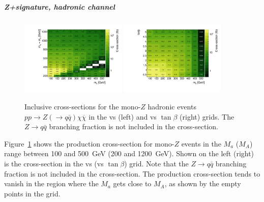 \subparagraph{Z+\MET signature, hadronic channel}

\begin{figure}
\centering
\includegraphics[width=0.45\textwidth]{texinputs/04_grid/figures/monoz/hadronic/grid_mA_ma_xsec.pdf}
\includegraphics[width=0.45\textwidth]{texinputs/04_grid/figures/monoz/hadronic/grid_tanb_ma_xsec.pdf}
\caption{Inclusive cross-sections for the mono-$Z$ hadronic events 
$pp \rightarrow Z(\to q\bar{q})\chi\overline{\chi}$ in the \ma vs \mA (left) and \ma vs $\tan\beta$ (right) grids.
The $Z \to q\bar{q}$ branching fraction is not included in the cross-section.}
\label{fig:monozhad_inc_xsec_grid}
\end{figure}

Figure~\ref{fig:monozhad_inc_xsec_grid} shows the production cross-section for mono-$Z$ events 
in the $M_a$ ($M_A$) range between 100 and 500~GeV (200 and 1200~GeV). Shown on the left (right) is 
the cross-section in the \ma vs \mA (\ma vs $\tan\beta$) grid. Note that the $Z \to q\bar{q}$ branching fraction 
is not included in the cross-section. The production cross-section 
tends to vanish in the region where the $M_a$ gets close to $M_A$, as shown by the empty points in the grid.


